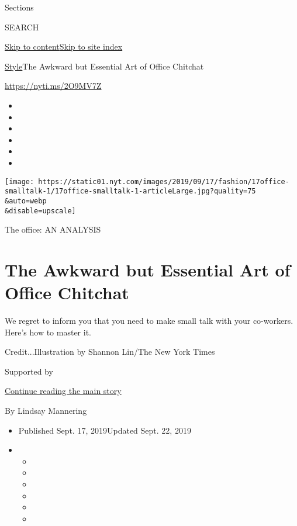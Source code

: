 Sections

SEARCH

\protect\hyperlink{site-content}{Skip to
content}\protect\hyperlink{site-index}{Skip to site index}

\href{/section/style}{Style}\textbar{}The Awkward but Essential Art of
Office Chitchat

\url{https://nyti.ms/2O9MV7Z}

\begin{itemize}
\item
\item
\item
\item
\item
\item
\end{itemize}

\texttt{[image: https://static01.nyt.com/images/2019/09/17/fashion/17office-smalltalk-1/17office-smalltalk-1-articleLarge.jpg?quality=75\\\&auto=webp\\\&disable=upscale]}

The office: AN ANALYSIS

\hypertarget{the-awkward-but-essential-art-of-office-chitchat}{%
\section{The Awkward but Essential Art of Office
Chitchat}\label{the-awkward-but-essential-art-of-office-chitchat}}

We regret to inform you that you need to make small talk with your
co-workers. Here's how to master it.

Credit...Illustration by Shannon Lin/The New York Times

Supported by

\protect\hyperlink{after-sponsor}{Continue reading the main story}

By Lindsay Mannering

\begin{itemize}
\item
  Published Sept. 17, 2019Updated Sept. 22, 2019
\item
  \begin{itemize}
  \item
  \item
  \item
  \item
  \item
  \item
  \end{itemize}
\end{itemize}

